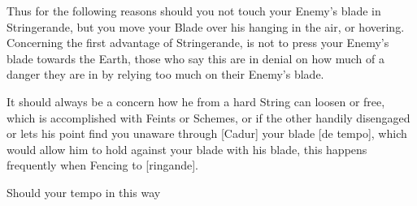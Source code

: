 Thus for the following reasons should you not touch your Enemy's blade
in Stringerande, but you move your Blade over his hanging in the
air, or hovering. Concerning the first
advantage of Stringerande, is not to press your Enemy's blade
towards the Earth, those who say this are in denial on how much of a
danger they are in by relying too much on their Enemy's blade. 

It should always be a concern how he from a hard String can loosen or
free, which is accomplished with Feints or Schemes, or if the other
handily disengaged or lets his point find you unaware through [Cadur]
your blade [de tempo], which would allow him to hold against your
blade with his blade, this happens frequently when Fencing to
[ringande].

Should your tempo in this way